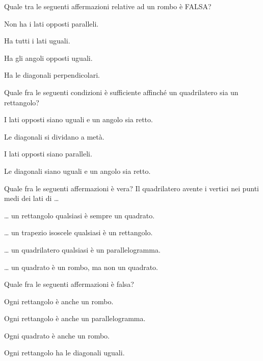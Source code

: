 \begin{esercizio}
\label{ese:4.63}
Quale tra le seguenti affermazioni relative ad un rombo è FALSA?
\begin{multicols}{2}
\begin{enumeratea}
\item Non ha i lati opposti paralleli.
\item Ha tutti i lati uguali.
\item Ha gli angoli opposti uguali.
\item Ha le diagonali perpendicolari.
\end{enumeratea}
\end{multicols}
\end{esercizio}

\begin{esercizio}
\label{ese:4.64}
Quale fra le seguenti condizioni è sufficiente affinché un quadrilatero sia un rettangolo?
\begin{enumeratea}
\item I lati opposti siano uguali e un angolo sia retto.
\item Le diagonali si dividano a metà.
\item I lati opposti siano paralleli.
\item Le diagonali siano uguali e un angolo sia retto.
\end{enumeratea}
\end{esercizio}

\begin{esercizio}
\label{ese:4.65}
Quale fra le seguenti affermazioni è vera?
Il quadrilatero avente i vertici nei punti medi dei lati di \ldots{}
\begin{enumeratea}
\item \ldots{} un rettangolo qualsiasi è sempre un quadrato.
\item \ldots{} un trapezio isoscele qualsiasi è un rettangolo.
\item \ldots{} un quadrilatero qualsiasi è un parallelogramma.
\item \ldots{} un quadrato è un rombo, ma non un quadrato.
\end{enumeratea}
\end{esercizio}

\begin{esercizio}
\label{ese:4.66}
Quale fra le seguenti affermazioni è falsa?
\begin{enumeratea}
\item Ogni rettangolo è anche un rombo.
\item Ogni rettangolo è anche un parallelogramma.
\item Ogni quadrato è anche un rombo.
\item Ogni rettangolo ha le diagonali uguali.
\end{enumeratea}
\end{esercizio}

